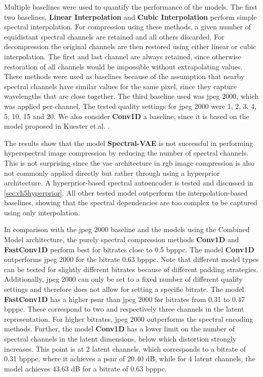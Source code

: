 Multiple baselines were used to quantify the performance of the models. The first two baselines, \textbf{Linear Interpolation} and \textbf{Cubic Interpolation} perform simple spectral interpolation. For compression using these methods, a given number of equidistant spectral channels are retained and all others discarded. For decompression the original channels are then restored using either linear or cubic interpolation. The first and last channel are always retained, since otherwise restoration of all channels would be impossible without extrapolating values. These methods were used as baselines because of the assumption that nearby spectral channels have similar values for the same pixel, since they capture wavelengths that are close together. The third baseline used was \ac{jpeg} 2000, which was applied per-channel. The tested quality settings for \ac{jpeg} 2000 were 1, 2, 3, 4, 5, 10, 15 and 20. We also consider \textbf{Conv1D} a baseline, since it is based on the model proposed in Kuester et.al. \citep{kuester_1d-convolutional_2021,kuester_transferability_2022}.

The results show that the model \textbf{Spectral-VAE} is not successful in performing hyperspectral image compression by reducing the number of spectral channels. This is not surprising since the \ac{vae} architecture in \ac{rgb} image compression is also not commonly applied directly but rather through using a hyperprior architecture. A hyperprior-based spectral autoencoder is tested and discussed in \autoref{sec:ch5hyperprior}. All other tested model outperform the interpolation-based baselines, showing that the spectral dependencies are too complex to be captured using only interpolation.

In comparison with the \ac{jpeg} 2000 baseline and the models using the Combined Model architecture, the purely spectral compression methods \textbf{Conv1D} and \textbf{FastConv1D} perform best for bitrates close to 0.5 \ac{bpppc}. The model \textbf{Conv1D} outperforms \ac{jpeg} 2000 for the bitrate 0.63 \ac{bpppc}. Note that different model types can be tested for slightly different bitrates because of different padding strategies. Additionally, \ac{jpeg} 2000 can only be set to a fixed number of different quality settings and therefore does not allow for setting a specific bitrate. The model \textbf{FastConv1D} has a higher \ac{psnr} than \ac{jpeg} 2000 for bitrates from 0.31 to 0.47 \ac{bpppc}. These correspond to two and respectively three channels in the latent representation. For higher bitrates, \ac{jpeg} 2000 outperforms the spectral encoding methods. Further, the model \textbf{Conv1D} has a lower limit on the number of spectral channels in the latent dimensions, below which distortion strongly increases. This point is at 2 latent channels, which corresponds to a bitrate of 0.31 \ac{bpppc}, where it achieves a \ac{psnr} of 20.40 dB, while for 4 latent channels, the model achieves 43.63 dB for a bitrate of 0.63 \ac{bpppc}.

